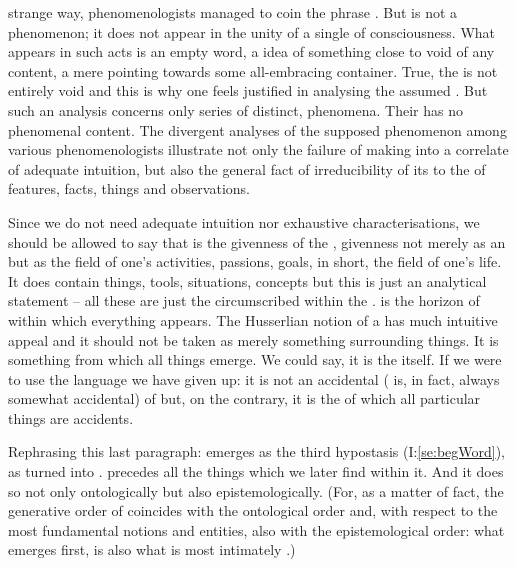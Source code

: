 strange way, phenomenologists managed to coin the phrase . But  is not a phenomenon; it does not appear in the unity
of a single  of consciousness. What appears in such acts is an empty
word, a  idea of something close to void of any content, a mere
 pointing towards some all-embracing container. True, the  is
not entirely void and this is why one feels justified in analysing the assumed
. But such an analysis concerns only series of distinct,
 phenomena.  Their  has no phenomenal content.  The
divergent analyses of the supposed phenomenon among various phenomenologists
illustrate not only the failure of making  into a correlate of
adequate intuition, but also the general fact of irreducibility of its
 to the  of features, facts, things and
observations.


\pa Since we do not need adequate intuition nor exhaustive characterisations, we
should be allowed to say that  is the givenness of the
, givenness not merely as an  but as the
field of one's activities, passions, goals, in short, the field of one's life.
It does contain {things}, tools, situations, concepts but this is just an
analytical statement -- all these are just the 
circumscribed within the \hoa.   is the horizon of
 within which everything  appears.  The
Husserlian notion of a  has much intuitive appeal and it should not
be taken as merely something surrounding  things. It is something
from which all  things emerge. We could say, it is the
 itself. If we were to use the language we have given up: it is
not an accidental  ( is, in fact, always somewhat
accidental) of   but, on the contrary, it is the
 of which all particular things are accidents.


Rephrasing this last paragraph:  emerges as the third hypostasis
(I:\ref{se:begWord}), as  turned into 
.  precedes all the things which we later find
within it. And it does so not only ontologically but also epistemologically.
(For, as a matter of fact, the generative order of  coincides with
the ontological order and, with respect to the most fundamental notions and
entities, also with the epistemological order: what emerges first, is also what
is most intimately .)


